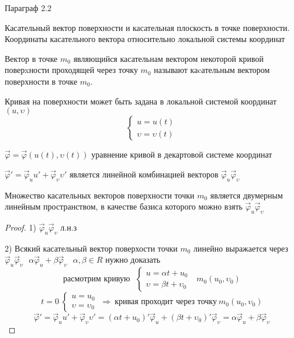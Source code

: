 \begin{title}[\Large]
  Параграф 2.2
\end{title}

\begin{title}[\Large]
  Касательный вектор поверхности и касательная плоскость в точке поверхности.
  Координаты касательного вектора относительно локальной системы координат
\end{title}

\begin{define}
  Вектор в точке $m_0$
  являющийся касательнам вектором некоторой кривой поверxности проходящей
  через точку $m_0$ называют каcательным вектором поверхности в точке $m_0$.

  Кривая на поверхности может быть задана в локальной системой координат
  $(u, \upsilon)$
  $$
  \left\{
    \begin{array}{l}
      u = u(t) \\
      \upsilon = \upsilon(t)
    \end{array}
  \right.
  $$

  $\vec \varphi = \vec \varphi(u(t), \upsilon(t))$ уравнение кривой в декартовой
  системе координат

  $\vec \varphi' = \vec \varphi_u u' + \vec \varphi_{\upsilon}
  \upsilon'$ является линейной комбинацией векторов $\vec \varphi_u
  \vec \varphi_{\upsilon}$
\end{define}

\begin{theorem}
  Множество касательных векторов поверхности точки $m_0$ является двумерным
  линейным пространством, в качестве базиса которого можно взять
  $\vec \varphi_u \vec \varphi_{\upsilon}$
\end{theorem}

\begin{proof}
  1) $\vec \varphi_u \vec \varphi_{\upsilon}$ л.н.з

  2) Всякий касательный вектор поверхости точки $m_0$ линейно выражается через
  $\vec \varphi_u \vec \varphi_{\upsilon} ~~~ \alpha \vec \varphi_u +\beta
  \vec \varphi_{\upsilon} ~~~ \alpha, \beta \in R$ нужно доказать
  $$
  \text{расмотрим кривую} ~~~
  \left\{
    \begin{array}{l}
      u = \alpha t + u_0 \\
      \upsilon = \beta t + \upsilon_0
    \end{array}
  \right. ~~~ m_0 (u_0, \upsilon_0)
  $$
  $$
  t = 0 ~
  \left\{
    \begin{array}{l}
      u = u_0 \\
      \upsilon = \upsilon_0
    \end{array}
  \right. ~ \Rightarrow ~ \text{кривая проходит через точку} ~
  m_0 (u_0, \upsilon_0)
  $$
  $$
  \vec \varphi' = \vec \varphi_u u' + \vec \varphi_{\upsilon} \upsilon' =
  (\alpha t + u_0)' \vec \varphi_u + (\beta t + \upsilon_0)'
  \vec \varphi_{\upsilon} = \alpha \vec \varphi_u  +
  \beta \vec \varphi_{\upsilon}
  $$
\end{proof}

